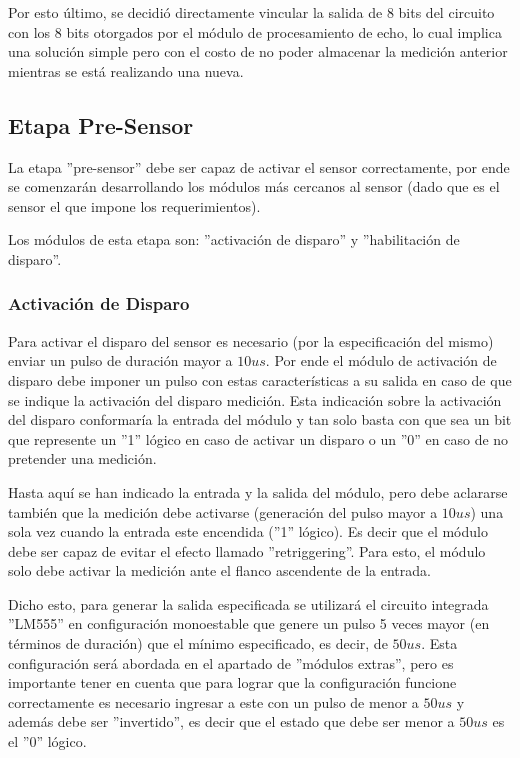Por esto último, se decidió directamente vincular la salida de 8 bits
del circuito con los 8 bits otorgados por el módulo de procesamiento
de echo, lo cual implica una solución simple pero con el costo de
no poder almacenar la medición anterior mientras se está realizando
una nueva.

\subsection{Etapa Pre-Sensor}

La etapa ''pre-sensor'' debe ser capaz de activar el sensor correctamente,
por ende se comenzarán desarrollando los módulos más cercanos al sensor
(dado que es el sensor el que impone los requerimientos).

Los módulos de esta etapa son: ''activación de disparo'' y ''habilitación
de disparo''.

\subsubsection{Activación de Disparo}

Para activar el disparo del sensor es necesario (por la especificación
del mismo) enviar un pulso de duración mayor a $10us$. Por ende el
módulo de activación de disparo debe imponer un pulso con estas características
a su salida en caso de que se indique la activación del disparo medición.
Esta indicación sobre la activación del disparo conformaría la entrada
del módulo y tan solo basta con que sea un bit que represente un ''1''
lógico en caso de activar un disparo o un ''0'' en caso de no pretender
una medición.\newline

Hasta aquí se han indicado la entrada y la salida del módulo, pero
debe aclararse también que la medición debe activarse (generación
del pulso mayor a $10us$) una sola vez cuando la entrada este encendida
(''1'' lógico). Es decir que el módulo debe ser capaz de evitar
el efecto llamado ''retriggering''. Para esto, el módulo solo debe
activar la medición ante el flanco ascendente de la entrada.

Dicho esto, para generar la salida especificada se utilizará el circuito
integrada ''LM555'' en configuración monoestable que genere un pulso
5 veces mayor (en términos de duración) que el mínimo especificado,
es decir, de $50us$. Esta configuración será abordada en el apartado
de ''módulos extras'', pero es importante tener en cuenta que para
lograr que la configuración funcione correctamente es necesario ingresar
a este con un pulso de menor a $50us$ y además debe ser ''invertido'',
es decir que el estado que debe ser menor a $50us$ es el ''0''
lógico.

